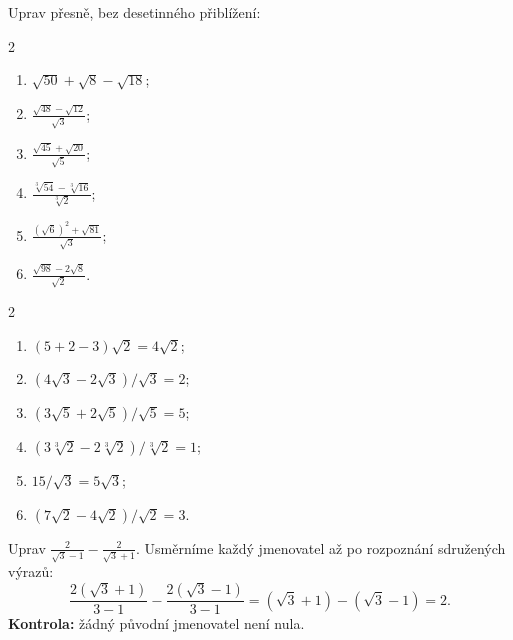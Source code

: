 \documentclass[11pt,a4paper]{article}
\begin{document}
\begin{zadaniReseniBox}[breakable=false,title={Samostatná práce 1: odmocni, slučuj, zjednoduš}]
Uprav přesně, bez desetinného přiblížení:
\begin{multicols}{2}
\begin{enumerate}[label=\alph*)]
\item $\sqrt{50}+\sqrt8-\sqrt{18}$;
\item $\displaystyle\frac{\sqrt{48}-\sqrt{12}}{\sqrt3}$;
\item $\displaystyle\frac{\sqrt{45}+\sqrt{20}}{\sqrt5}$;
\item $\displaystyle\frac{\sqrt[3]{54}-\sqrt[3]{16}}{\sqrt[3]2}$;
\item $\displaystyle\frac{(\sqrt6)^2+\sqrt{81}}{\sqrt3}$;
\item $\displaystyle\frac{\sqrt{98}-2\sqrt8}{\sqrt2}$.
\end{enumerate}
\end{multicols}
\tcblower
\begin{multicols}{2}
\begin{enumerate}[label=\alph*)]
\item $(5+2-3)\sqrt2=\boxed{4\sqrt2}$;
\item $(4\sqrt3-2\sqrt3)/\sqrt3=\boxed2$;
\item $(3\sqrt5+2\sqrt5)/\sqrt5=\boxed5$;
\item $(3\sqrt[3]2-2\sqrt[3]2)/\sqrt[3]2=\boxed1$;
\item $15/\sqrt3=\boxed{5\sqrt3}$;
\item $(7\sqrt2-4\sqrt2)/\sqrt2=\boxed3$.
\end{enumerate}
\end{multicols}
\end{zadaniReseniBox}

\begin{prikladReseniBox}[breakable=false,title={Příklad 2: rozdíl dvou zlomků}]
Uprav $\displaystyle\frac2{\sqrt3-1}-\frac2{\sqrt3+1}$.
\tcblower
Usměrníme každý jmenovatel až po rozpoznání sdružených výrazů:
\[
\frac{2(\sqrt3+1)}{3-1}-\frac{2(\sqrt3-1)}{3-1}
=(\sqrt3+1)-(\sqrt3-1)=\boxed2.
\]
\textbf{Kontrola:} žádný původní jmenovatel není nula.
\end{prikladReseniBox}
\end{document}
